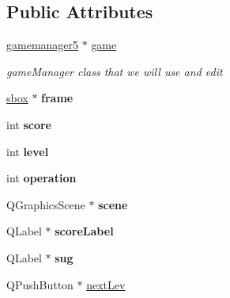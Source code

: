 \subsection*{\-Public \-Attributes}
\begin{DoxyCompactItemize}
\item 
\hypertarget{classnextwindow_ae45b08be11edc709ca2f6b73bf462254}{\hyperlink{classgamemanager5}{gamemanager5} $\ast$ \hyperlink{classnextwindow_ae45b08be11edc709ca2f6b73bf462254}{game}}\label{classnextwindow_ae45b08be11edc709ca2f6b73bf462254}

\begin{DoxyCompactList}\small\item\em game\-Manager class that we will use and edit \end{DoxyCompactList}\item 
\hypertarget{classnextwindow_a086e0c86c1e974bd39b48b2c09cd22c9}{\hyperlink{classsbox}{sbox} $\ast$ {\bfseries frame}}\label{classnextwindow_a086e0c86c1e974bd39b48b2c09cd22c9}

\item 
\hypertarget{classnextwindow_a489f749224efac4e971e6a8840b73e66}{int {\bfseries score}}\label{classnextwindow_a489f749224efac4e971e6a8840b73e66}

\item 
\hypertarget{classnextwindow_a90b3d218995df6f53f4a3a87f394f773}{int {\bfseries level}}\label{classnextwindow_a90b3d218995df6f53f4a3a87f394f773}

\item 
\hypertarget{classnextwindow_a43a38e9efad9efea3807f5635477dabf}{int {\bfseries operation}}\label{classnextwindow_a43a38e9efad9efea3807f5635477dabf}

\item 
\hypertarget{classnextwindow_a9378c617d7634b20a383dde734795393}{\-Q\-Graphics\-Scene $\ast$ {\bfseries scene}}\label{classnextwindow_a9378c617d7634b20a383dde734795393}

\item 
\hypertarget{classnextwindow_a3e96c75a5d328a62952741c50c5b64b4}{\-Q\-Label $\ast$ {\bfseries score\-Label}}\label{classnextwindow_a3e96c75a5d328a62952741c50c5b64b4}

\item 
\hypertarget{classnextwindow_ad7dbc38f268257a4d93f3eaee119c6d2}{\-Q\-Label $\ast$ {\bfseries sug}}\label{classnextwindow_ad7dbc38f268257a4d93f3eaee119c6d2}

\item 
\hypertarget{classnextwindow_a9c340450d9b687d23ba8f410ff38a31f}{\-Q\-Push\-Button $\ast$ \hyperlink{classnextwindow_a9c340450d9b687d23ba8f410ff38a31f}{next\-Lev}}\label{classnextwindow_a9c340450d9b687d23ba8f410ff38a31f}


\end{DoxyCompactItemize}
